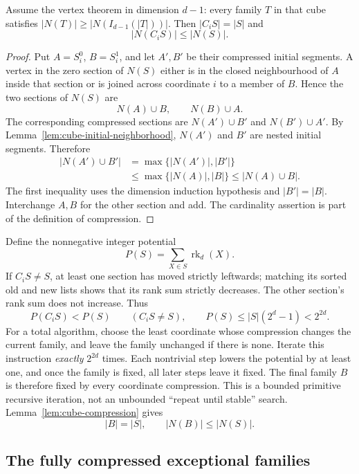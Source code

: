 \begin{lemma}
\label{lem:cube-compression}
Assume the vertex theorem in dimension \(d-1\): every family \(T\)
in that cube satisfies
\( |N(T)|\geq|N(I_{d-1}(|T|))|\).
Then \( |C_iS|=|S|\) and
\[
 |N(C_iS)|\leq |N(S)|.
\]
\end{lemma}
\begin{proof}
Put \(A=S_i^0\), \(B=S_i^1\), and let \(A',B'\) be their compressed
initial segments.  A vertex in the zero section of \(N(S)\) either
is in the closed neighbourhood of \(A\) inside that section or is
joined across coordinate \(i\) to a member of \(B\).  Hence the two
sections of \(N(S)\) are
\[
 N(A)\cup B,\qquad N(B)\cup A.
\]
The corresponding compressed sections are \(N(A')\cup B'\) and
\(N(B')\cup A'\).  By
Lemma~\ref{lem:cube-initial-neighborhood}, \(N(A')\) and \(B'\)
are nested initial segments.  Therefore
\[
 \begin{split}
 |N(A')\cup B'|
 &=\max\{|N(A')|,|B'|\}\\
 &\leq\max\{|N(A)|,|B|\}
 \leq|N(A)\cup B|.
 \end{split}
\]
The first inequality uses the dimension induction hypothesis and
\(|B'|=|B|\).  Interchange \(A,B\) for the other section and add.
The cardinality assertion is part of the definition of compression.
\end{proof}

Define the nonnegative integer potential
\[
 P(S)=\sum_{X\in S}\operatorname{rk}_d(X).
\]
If \(C_iS\neq S\), at least one section has moved strictly leftwards;
matching its sorted old and new lists shows that its rank sum strictly
decreases.  The other section's rank sum does not increase.  Thus
\[
 P(C_iS)<P(S)\qquad(C_iS\neq S),
 \qquad P(S)\leq |S|(2^d-1)<2^{2d}.
\]
For a total algorithm, choose the least coordinate whose compression
changes the current family, and leave the family unchanged if there is
none.  Iterate this instruction \emph{exactly} \(2^{2d}\) times.
Each nontrivial step lowers the potential by at least one, and once the
family is fixed, all later steps leave it fixed.  The final family \(B\)
is therefore fixed by every coordinate compression.  This is a bounded
primitive recursive iteration, not an unbounded ``repeat until stable''
search.  Lemma~\ref{lem:cube-compression} gives
\[
 |B|=|S|,\qquad |N(B)|\leq|N(S)|.
\]

\subsection{The fully compressed exceptional families}

